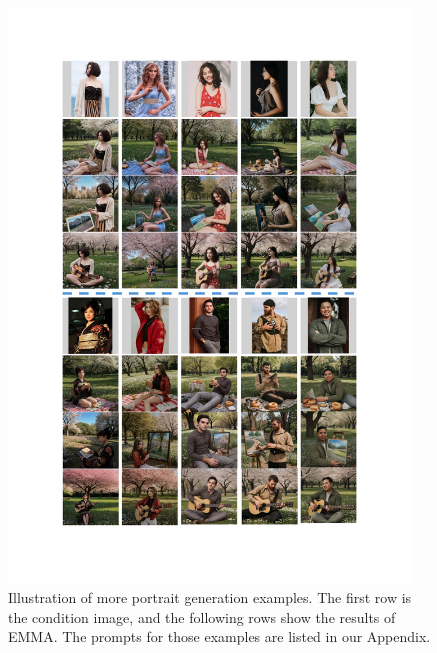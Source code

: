 \begin{figure}[t]
    \centering
    \includegraphics[width=0.95\textwidth]{images/supplymentary.pdf}
    \caption{Illustration of more portrait generation examples. The first row is the condition image, and the following rows show the results of EMMA. The prompts for those examples are listed in our Appendix.}
    \label{fig:supplymentary}
\end{figure}
